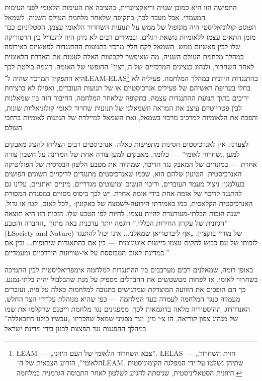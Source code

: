 התפישה הזו היא כמובן שגויה וריאקציונרית, בהציבה את העימות הלאומי לפני העימות המעמדי. אבל מעבר לכך, בתקופה שלאחר מלחמת העולם השניה, לשמאל הפוסט-קולוניאליסטי היה מונופול של ממש על תנועות השחרור הלאומי עצמן. הסטליניזם כבר מזמן התאים עצמו ללאומיות נושאת-דגלים, ובמקרים רבים לא ניתן היה להבדיל בין הרטוריקה שלו לבין פאשיזם ממש. השמאל לקח חלק מרכזי בתנועות ההתנגדות לפאשיזם באירופה במהלך מלחמת העולם השניה, מה שאיפשר לקבוצות האלה לעטות את האדרת הלאומית לאחר השחרור, ולנהוג כנציגים המרכזיים של ה„רצון” החופשי של האומה. דוגמה בולטת לכך היא התפקיד המרכזי שהיה ל־\L{EAM-ELAS}\footnote{\L{EAM}~— „צבא השחרור הלאומי של העם היווני”. \L{ELAS}~— „חזית השחרור הלאומי”, הזרוע הצבאית של ה־\L{EAM}. שתיהן נשלטו על־ידי המפלגה הקומוניסטית היוונית הסטאליניסטית, שניסתה להגיע לשלטון לאחר התבוסה הגרמנית במלחמה.} בהתנגדות היוונית במהלך המלחמה. פעיליה לא בחלו בעריפת ראשיהם של פעילים אנרכיסטיים או של תנועות העובדים, ואפילו לא ברציחת יריבים בתוך תנועת ההתנגדות עצמה. בתקופה שלאחר המלחמה, החיבור הזה בין שמאלנות לבין פטריוטיזם עיצב את המראה השמאלני של תנועות שחרור לאומי קולוניאליות שונות, והפכה את הלאומיות למרכיב מרכזי בשמאל, ואת השמאל למיילדת של תנועות לאומיות ברחבי העולם.

לצערנו, אין לאנרכיסטים חסינות מתפישות כאלה. אנרכיסטים רבים הצליחו להציג מאבקים למען „שחרור לאומי”~— כלומר, מאבקים למען צורה אחת של המדינה על חשבון צורה אחרת~— במונחים של המאבק נגד הדיכוי, שמהווה את מטבע הלשון הבסיסית של הפוליטיקה האנרכיסטית. הטיעון שלהם הוא, שכמו שאנרכיסטים מתנגדים לדיכויים השונים הפושים בעולמנו: ניצול מעמד העובדים, ודיכוי הנשים ומיעוטים מגדריים, מיניים ואתניים, עלינו גם להתנגד לדיכוי של אומה אחת בידי אומה אחרת. יש לכך ביסוס מסויים במסגרת המסורת האנרכיסטית הקלאסית, כמו באמירתו הידועה-לשמצה של באקונין: „לכל לאום, קטן או גדול, ישנה הזכות הבלתי-מעורערת להיות עצמו, לחיות לפי הטבע שלו. הזכות הזו היא תוצאה הגיונית של עקרון החירות הכללי.” דוגמה יותר עדכנית באה מתוך „החברה והטבע” (\L{Society and Nature}) של מוריי בוקצ׳ין: „אף ליברטריאן שמאלני... אינו יכול להתנגד לזכותו של עם כבוש להקים עצמו כיישות אוטונומית~— בין אם בהתאגדות שיתופית... ובין אם במדינת־לאום המבוססת על אי-שוויונות היררכיים ומעמדיים.”

באופן דומה, שמאלנים רבים מערבבים בין ההתנגדות למלחמה אימפריאליסטית לבין התמיכה בשחרור לאומי, או לפחות מטשטשים את ההבדלים מספיק על מנת שהבלבול יהיה בלתי-נמנע. כך הם הופכים את הזוועה המוצדקת שמרגישים כתגובה למלחמות כאלה על פיה, ועוברים מעמדה כנגד המלחמה לעמדה בעד המלחמה~— כפי שהיא מנוהלת על־ידי הצד החלש, האנדרדוג. ההיסטוריה מלאה בדוגמאות לכך: ממפגינים נגד מלחמת וייטנם שדקלמו את שמו של מנהיג צפון קוריאה, הו צ׳י מין, ועד מפגיני שמאל שהכריזו „עכשיו כולנו חיזבאללה” במהלך ההפגנות נגד הפצצת לבנון בידי מדינת ישראל.

